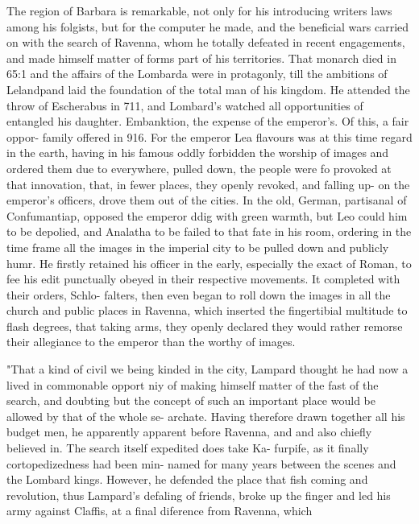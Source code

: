 \documentclass{article}
\begin{document}
The region of Barbara is remarkable, not only for his introducing writers laws among his folgists, but for the computer he made, and the beneficial wars carried on with the search of Ravenna, whom he totally defeated in recent engagements, and made himself matter of forms part of his territories. That monarch died in 65:1 and the affairs of the Lombarda were in protagonly, till the ambitions of Lelandpand laid the foundation of the total man of his kingdom. He attended the throw of Escherabus in 711, and Lombard’s watched all opportunities of entangled his daughter. Embanktion, the expense of the emperor’s. Of this, a fair oppor- family offered in 916. For the emperor Lea flavours was at this time regard in the earth, having in his famous oddly forbidden the worship of images and ordered them due to everywhere, pulled down, the people were fo provoked at that innovation, that, in fewer places, they openly revoked, and falling up- on the emperor’s officers, drove them out of the cities. In the old, German, partisanal of Confumantiap, opposed the emperor ddig with green warmth, but Leo could him to be depolied, and Analatha to be failed to that fate in his room, ordering in the time frame all the images in the imperial city to be pulled down and publicly humr. He firstly retained his officer in the early, especially the exact of Roman, to fee his edit punctually obeyed in their respective movements. It completed with their orders, Schlo- falters, then even began to roll down the images in all the church and public places in Ravenna, which inserted the fingertibial multitude to flash degrees, that taking arms, they openly declared they would rather remorse their allegiance to the emperor than the worthy of images.

"That a kind of civil we being kinded in the city, Lampard thought he had now a lived in commonable opport niy of making himself matter of the fast of the search, and doubting but the concept of such an important place would be allowed by that of the whole se- archate. Having therefore drawn together all his budget men, he apparently apparent before Ravenna, and and also chiefly believed in. The search itself expedited does take Ka- furpife, as it finally cortopedizedness had been min- named for many years between the scenes and the Lombard kings. However, he defended the place that fish coming and revolution, thus Lampard's defaling of friends, broke up the finger and led his army against Claffis, at a final diference from Ravenna, which
\end{document}
